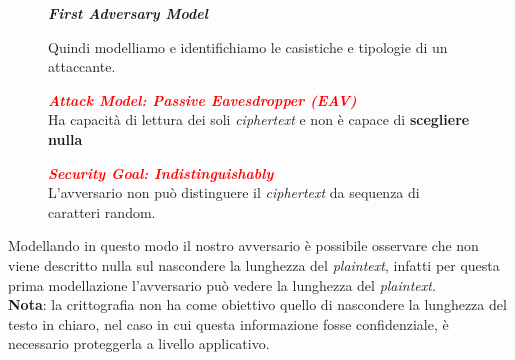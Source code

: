 \begin{figure}[h]
    \centering
    \begin{large}
        \textbf{\textit{First Adversary Model}} \\
    \end{large}
    Quindi modelliamo e identifichiamo le casistiche e tipologie di un attaccante. \\

    \begin{minipage}[t]{0.50\textwidth}
        \centering
        \begin{boxA}
            \textcolor{red}{\textbf{\textit{Attack Model: Passive Eavesdropper (EAV)}}} \\
            Ha capacità di lettura dei soli \textit{ciphertext} e non è capace di \textbf{scegliere nulla}
        \end{boxA}
    \end{minipage}
    \begin{minipage}[t]{0.45\textwidth}
        \centering
        \begin{boxA}
            \textcolor{red}{\textbf{\textit{Security Goal: Indistinguishably}}} \\
            L'avversario non può distinguere il \textit{ciphertext} da sequenza di caratteri random.
        \end{boxA}
    \end{minipage}
\end{figure}

\begin{flushleft}
    Modellando in questo modo il nostro avversario è possibile osservare che non viene descritto nulla sul nascondere la lunghezza del \textit{plaintext}, infatti per questa prima modellazione l'avversario può vedere la lunghezza del \textit{plaintext}. \\
    \textbf{Nota}: la crittografia non ha come obiettivo quello di nascondere la lunghezza del testo in chiaro, nel caso in cui questa informazione fosse confidenziale, è necessario proteggerla a livello applicativo.
\end{flushleft}

